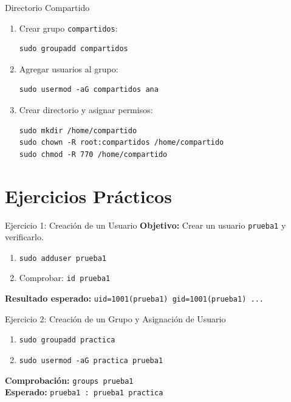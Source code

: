 \documentclass{beamer}
\begin{document}
\begin{frame}{Directorio Compartido}
    \begin{enumerate}
        \item Crear grupo \texttt{compartidos}:
        \begin{lstlisting}
sudo groupadd compartidos
        \end{lstlisting}
        \item Agregar usuarios al grupo:
        \begin{lstlisting}
sudo usermod -aG compartidos ana
        \end{lstlisting}
        \item Crear directorio y asignar permisos:
        \begin{lstlisting}
sudo mkdir /home/compartido
sudo chown -R root:compartidos /home/compartido
sudo chmod -R 770 /home/compartido
        \end{lstlisting}
    \end{enumerate}
\end{frame}

\section{Ejercicios Prácticos}

\begin{frame}{Ejercicio 1: Creación de un Usuario}
    \textbf{Objetivo:} Crear un usuario \texttt{prueba1} y verificarlo.
    \begin{enumerate}
        \item \texttt{sudo adduser prueba1}
        \item Comprobar: \texttt{id prueba1}
    \end{enumerate}
    \textbf{Resultado esperado:} \texttt{uid=1001(prueba1) gid=1001(prueba1) ...}
\end{frame}

\begin{frame}{Ejercicio 2: Creación de un Grupo y Asignación de Usuario}
    \begin{enumerate}
        \item \texttt{sudo groupadd practica}
        \item \texttt{sudo usermod -aG practica prueba1}
    \end{enumerate}
    \textbf{Comprobación:} \texttt{groups prueba1} \\
    \textbf{Esperado:} \texttt{prueba1 : prueba1 practica}
\end{frame}
\end{document}
